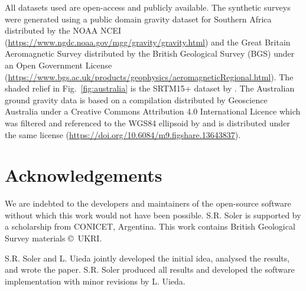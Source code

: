 All datasets used are open-access and publicly available.
The synthetic surveys were generated using
a public domain gravity dataset for Southern Africa distributed by the
NOAA NCEI (\url{https://www.ngdc.noaa.gov/mgg/gravity/gravity.html})
and the Great Britain Aeromagnetic
Survey distributed by the
British Geological Survey (BGS) under an Open Government License
(\url{https://www.bgs.ac.uk/products/geophysics/aeromagneticRegional.html}).
The shaded relief in Fig.~\ref{fig:australia} is the SRTM15+ dataset by
\citet{tozer2019}.
The Australian ground gravity
data is based on a compilation distributed by Geoscience Australia under a
Creative Commons Attribution 4.0 International Licence \citep{wynne2018}  which
was filtered and referenced to the WGS84 ellipsoid by
\citet{australia_compilation} and is distributed under the same license
(\url{https://doi.org/10.6084/m9.figshare.13643837}).



\section{Acknowledgements}

We are indebted to the developers and maintainers of the open-source software
without which this work would not have been possible.
S.R. Soler is supported by a scholarship from CONICET, Argentina.
This work contains British Geological Survey materials ©~UKRI.

S.R. Soler and L. Uieda jointly developed the initial idea, analysed the
results, and wrote the paper. S.R. Soler produced all results and developed the
software implementation with minor revisions by L. Uieda.
